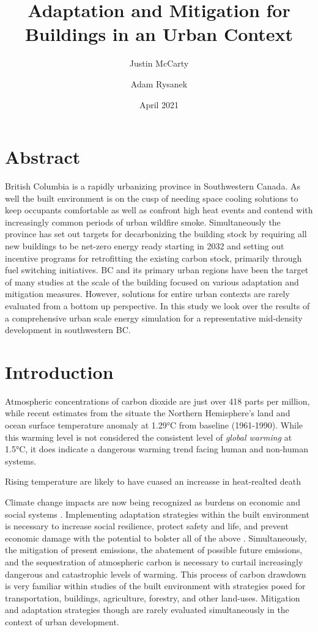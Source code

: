 \documentclass{article}
\title{Adaptation and Mitigation for Buildings in an Urban Context}
\author{Justin McCarty}
\author{Adam Rysanek}
\date{April 2021}
\begin{document}
\maketitle

\section{Abstract}
British Columbia is a rapidly urbanizing province in Southwestern Canada. As well the built environment is on the cusp of needing space cooling solutions to keep occupants comfortable as well as confront high heat events and contend with increasingly common periods of urban wildfire smoke. Simultaneously the province has set out targets for decarbonizing the building stock by requiring all new buildings to be net-zero energy ready starting in 2032 and setting out incentive programs for retrofitting the existing carbon stock, primarily through fuel switching initiatives. BC and its primary urban regions have been the target of many studies at the scale of the building focused on various adaptation and mitigation measures. However, solutions for entire urban contexts are rarely evaluated from a bottom up perspective. In this study we look over the results of a comprehensive urban scale energy simulation for a representative mid-density development in southwestern BC. 

\section{Introduction}
Atmospheric concentrations of carbon dioxide are just over 418 parts per million, while recent estimates from the \citet{noauthor_state_2020} situate the Northern Hemisphere’s land and ocean surface temperature anomaly at 1.29°C from baseline (1961-1990). While this warming level is not considered the consistent level of \textit{global warming} at 1.5°C, it does indicate a dangerous warming trend facing human and non-human systems. 

Rising temperature are likely to have cuased an increasse in heat-realted death

Climate change impacts are now being recognized as burdens on economic and social systems \citep{frame_climate_2020}. Implementing adaptation strategies within the built environment is necessary to increase social resilience, protect safety and life, and prevent economic damage with the potential to bolster all of the above \citep{schunemann_mitigation_2020}. Simultaneously, the mitigation of present emissions, the abatement of possible future emissions, and the sequestration of atmospheric carbon is necessary to curtail increasingly dangerous and catastrophic levels of warming. This process of carbon drawdown is very familiar within studies of the built environment with strategies posed for transportation, buildings, agriculture, forestry, and other land-uses. Mitigation and adaptation strategies though are rarely evaluated simultaneously in the context of urban development.
\end{document}
